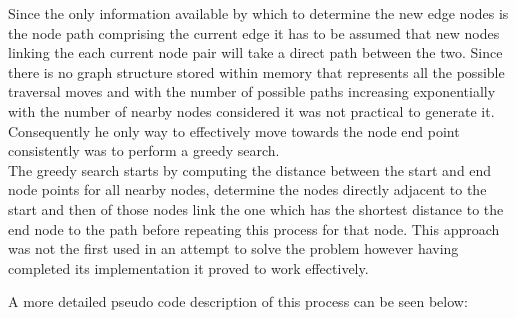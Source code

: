 \noindent
Since the only information available by which to determine the new edge nodes is the node path comprising the current edge it has to be assumed that new nodes linking the each current node pair will take a direct path between the two. Since there is no graph structure stored within memory that represents all the possible traversal moves and with the number of possible paths increasing exponentially with the number of nearby nodes considered it was not practical to generate it. Consequently he only way to effectively move towards the node end point consistently was to perform a greedy search. \\ 

\noindent
The greedy search starts by computing the distance between the start and end node points for all nearby nodes, determine the nodes directly adjacent to the start and then of those nodes link the one which has the shortest distance to the end node to the path before repeating this process for that node. This approach was not the first used in an attempt to solve the problem however having completed its implementation it proved to work effectively.


 A more detailed pseudo code description of this process can be seen below:


